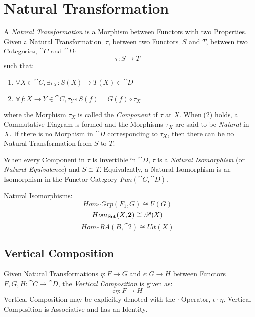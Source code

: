 \section{Natural Transformation}\label{sec:natural_transformation}

A \emph{Natural Transformation} is a Morphism between Functors with
two Properties. Given a Natural Transformation, $\tau$, between two
Functors, $S$ and $T$, between two Categories, $\cat{C}$ and
$\cat{D}$:
\[
  \tau : S \rightarrow T
\]
such that:
\begin{enumerate}
  \item $\forall X \in \cat{C},
    \exists \tau_X : S(X) \rightarrow T(X) \in \cat{D}$
  \item $\forall f : X \rightarrow Y \in \cat{C},
    \tau_Y \circ S(f) = G(f) \circ \tau_X$
\end{enumerate}
where the Morphism $\tau_X$ is called the \emph{Component} of $\tau$
at $X$. When (2) holds, a Commutative Diagram is formed and the
Morphisms $\tau_X$ are said to be \emph{Natural} in $X$. If there is
no Morphism in $\cat{D}$ corresponding to $\tau_X$, then there can
be no Natural Transformation from $S$ to $T$.

When every Component in $\tau$ is Invertible in $\cat{D}$, $\tau$
is a \emph{Natural Isomorphism} (or \emph{Natural Equivalence}) and $S
\cong T$. Equivalently, a Natural Isomorphism is an Isomorphism in the
Functor Category $Fun(\cat{C},\cat{D})$.

Natural Isomorphisms:
\[
  Hom_\cat{Grp}(F_1,G) \cong U(G)
\]\[
  Hom_\mathbf{Set}(X,\mathbf{2}) \cong \mathscr{P}(X)
\]\[
  Hom_\cat{BA}(B,\cat{2}) \cong Ult(X)
\]



\subsection{Vertical Composition}\label{sec:vertical_composition}

Given Natural Transformations $\eta : F \rightarrow G$ and $\epsilon :
G \rightarrow H$ between Functors $F,G,H : \cat{C} \rightarrow
\cat{D}$, the \emph{Vertical Composition} is given as:
\[
  \epsilon \eta : F \rightarrow H
\]
Vertical Composition may be explicitly denoted with the $\cdot$
Operator, $\epsilon \cdot \eta$. Vertical Composition is Associative
and has an Identity.



